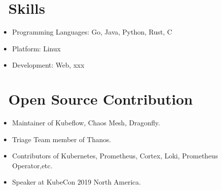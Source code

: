 \documentclass{resume}
\begin{document}
\section{\faCogs\ Skills}
\begin{itemize}[parsep=0.5ex]
  \item Programming Languages: Go, Java, Python, Rust, C
  \item Platform: Linux
  \item Development: Web, xxx
\end{itemize}

\section{\faInfo\ Open Source Contribution}
\begin{itemize}[parsep=0.5ex]
  \item Maintainer of Kubeflow, Chaos Mesh, Dragonfly.
  \item Triage Team member of Thanos.
  \item Contributors of Kubernetes, Prometheus, Cortex, Loki, Prometheus Operator,etc.
  \item Speaker at KubeCon 2019 North America.
\end{itemize}
\end{document}
